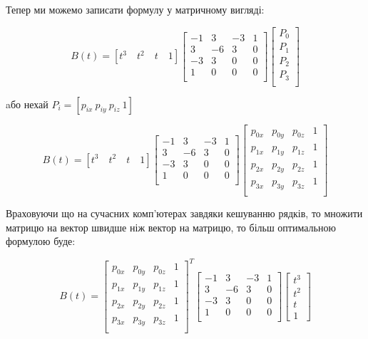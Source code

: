 \documentclass[14pt,a4paper]{extarticle}
\theoremstyle{definition}
\renewcommand{\[}{\begin{singlespace}\begin{equation*}}
\renewcommand{\]}{\end{equation*}\end{singlespace}}
\begin{document}
Тепер ми можемо записати формулу у матричному вигляді:
\[B(t)=[t^3\quad t^2\quad t\quad 1]\left[\begin{matrix}
-1 &  3 & -3 & 1 \\
 3 & -6 &  3 & 0 \\
-3 &  3 &  0 & 0 \\
 1 &  0 &  0 & 0 \\
\end{matrix}\right]\left[\begin{matrix}
P_0 \\ P_1 \\ P_2 \\ P_3 \\
\end{matrix}\right]\]
aбо нехай $P_i = [p_{ix}\ p_{iy}\ p_{iz}\ 1]$
\[B(t)=[t^3\quad t^2\quad t\quad 1]\left[\begin{matrix}
-1 &  3 & -3 & 1 \\
 3 & -6 &  3 & 0 \\
-3 &  3 &  0 & 0 \\
 1 &  0 &  0 & 0 \\
\end{matrix}\right]\left[\begin{matrix}
p_{0x} & p_{0y} & p_{0z} & 1 \\
p_{1x} & p_{1y} & p_{1z} & 1 \\
p_{2x} & p_{2y} & p_{2z} & 1 \\
p_{3x} & p_{3y} & p_{3z} & 1 \\
\end{matrix}\right]\]

Враховуючи що на сучасних комп'ютерах завдяки кешуванню рядків, то множити матрицю на вектор швидше ніж вектор на матрицю, то більш оптимальною формулою буде: 
\[B(t)=\left[\begin{matrix}
p_{0x} & p_{0y} & p_{0z} & 1 \\
p_{1x} & p_{1y} & p_{1z} & 1 \\
p_{2x} & p_{2y} & p_{2z} & 1 \\
p_{3x} & p_{3y} & p_{3z} & 1 \\
\end{matrix}\right]^T\left[\begin{matrix}
-1 &  3 & -3 & 1 \\
 3 & -6 &  3 & 0 \\
-3 &  3 &  0 & 0 \\
 1 &  0 &  0 & 0 \\
\end{matrix}\right]\left[\begin{matrix}t^3\\t^2\\t\\1\end{matrix}\right]\]
\end{document}
